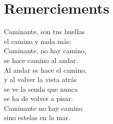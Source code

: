 \chapter*{Remerciements}
\renewcommand\chapterillustration{REM/REM}
\ThisULCornerWallPaper{1}{\chapterillustration}

\begin{fquote}
	\begin{flushright}
		Caminante, son tus huellas\\
		el camino y nada más;\\
		Caminante, no hay camino,\\
		se hace camino al andar.\\
		Al andar se hace el camino,\\
		y al volver la vista atrás\\
		se ve la senda que nunca\\
		se ha de volver a pisar.\\
		Caminante no hay camino\\
		sino estelas en la mar.\\
	\end{flushright}
\end{fquote}

\lettrine[lines=4, slope=-0.5em]{}{}

\tikzexternaldisable
{}
\tikzexternalenable